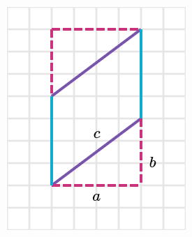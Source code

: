 \begin{solutionbox}{10cm}
\begin{minipage}{0.4\textwidth}
\begin{multicols}{2}
\begin{figure}[H]
                \includegraphics[width=0.9\linewidth]{../images/peri_paralelogramo_01b.png}
                \caption{}
                \label{fig:peri_paralelogramo_01b}
            \end{figure}
        \end{multicols}
        \begin{multicols}{2}
            \begin{figure}[H]
                \centering

\end{figure}
\end{multicols}
\end{minipage}
\end{solutionbox}
